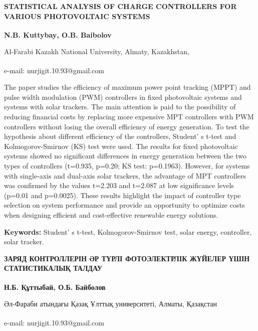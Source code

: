 \begin{articleheader}
{\bfseries STATISTICAL ANALYSIS OF CHARGE CONTROLLERS FOR VARIOUS
PHOTOVOLTAIC SYSTEMS}

{\bfseries
N.B. Kuttybay\textsuperscript{\envelope },
O.B. Baibolov
}
\end{articleheader}

\begin{affiliation}
Al-Farabi Kazakh National University, Almaty, Kazakhstan,

\textsuperscript{\envelope }e-mail: nurjigit.10.93@gmail.com
\end{affiliation}

The paper studies the efficiency of maximum power point tracking (MPPT)
and pulse width modulation (PWM) controllers in fixed photovoltaic
systems and systems with solar trackers. The main attention is paid to
the possibility of reducing financial costs by replacing more expensive
MPT controllers with PWM controllers without losing the overall
efficiency of energy generation. To test the hypothesis about different
efficiency of the controllers, Student' s t-test and
Kolmogorov-Smirnov (KS) test were used. The results for fixed
photovoltaic systems showed no significant differences in energy
generation between the two types of controllers (t=0.935, p=0.20; KS
test: p=0.1963). However, for systems with single-axis and dual-axis
solar trackers, the advantage of MPT controllers was confirmed by the
values \hspace{0pt}\hspace{0pt}t=2.203 and t=2.087 at low significance
levels (p=0.01 and p=0.0025). These results highlight the impact of
controller type selection on system performance and provide an
opportunity to optimize costs when designing efficient and
cost-effective renewable energy solutions.

{\bfseries Keywords:} Student' s t-test, Kolmogorov-Smirnov
test, solar energy, controller, solar tracker.

\begin{articleheader}
{\bfseries ЗАРЯД КОНТРОЛЛЕРІН ӘР ТҮРЛІ ФОТОЭЛЕКТРЛІК ЖҮЙЕЛЕР ҮШІН
СТАТИСТИКАЛЫҚ ТАЛДАУ}

{\bfseries
Н.Б. Құттыбай\textsuperscript{\envelope },
О.Б. Байболов}
\end{articleheader}

\begin{affiliation}
Әл-Фараби атындағы Қазақ Ұлттық университеті, Алматы, Қазақстан

\textsuperscript{\envelope }e-mail: nurjigit.10.93@gmail.com
\end{affiliation}

